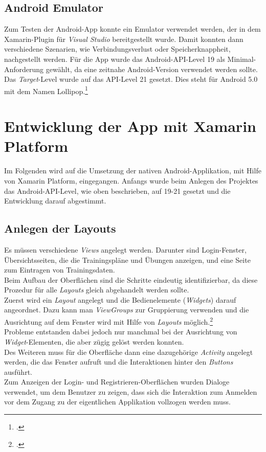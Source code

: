 \subsection{Android Emulator}
\label{ssec:xamarin-emulator}
Zum Testen der Android-App konnte ein Emulator verwendet werden, der in dem Xamarin-Plugin für \textit{Visual Studio} bereitgestellt wurde. Damit konnten dann verschiedene Szenarien, wie Verbindungsverlust oder Speicherknappheit, nachgestellt werden. Für die App wurde das Android-API-Level 19 als Minimal-Anforderung gewählt, da eine zeitnahe Android-Version verwendet werden sollte. Das \textit{Target}-Level wurde auf das API-Level 21 gesetzt. Dies steht für Android 5.0 mit dem Namen Lollipop.\footcite{Xamarin-API}
\section{Entwicklung der App mit Xamarin Platform}
\label{sec:nat-umsetzung}
Im Folgenden wird auf die Umsetzung der nativen Android-Applikation, mit Hilfe von Xamarin Platform, eingegangen. Anfangs wurde beim Anlegen des Projektes das Android-API-Level, wie oben beschrieben, auf 19-21 gesetzt und die Entwicklung darauf abgestimmt.

\subsection{Anlegen der Layouts}
\label{ssec:nat-layouts}
Es müssen verschiedene \textit{Views} angelegt werden. Darunter sind Login-Fenster, Übersichtsseiten, die die Trainingspläne und Übungen anzeigen, und eine Seite zum Eintragen von Trainingsdaten.\\
Beim Aufbau der Oberflächen sind die Schritte eindeutig identifizierbar, da diese Prozedur für alle \textit{Layouts} gleich abgehandelt werden sollte.\\
Zuerst wird ein \textit{Layout} angelegt und die Bedienelemente (\textit{Widgets}) darauf angeordnet. Dazu kann man \textit{ViewGroups} zur Gruppierung verwenden und die Ausrichtung auf dem Fenster wird mit Hilfe von \textit{Layouts} möglich.\footcite[Vgl. S. 58ff.]{Android-BeckerPant}\\
Probleme entstanden dabei jedoch nur manchmal bei der Ausrichtung von \textit{Widget}-Elementen, die aber zügig gelöst werden konnten.\\
Des Weiteren muss für die Oberfläche dann eine dazugehörige \textit{Activity} angelegt werden, die das Fenster aufruft und die Interaktionen hinter den \textit{Buttons} ausführt.\\
Zum Anzeigen der Login- und Registrieren-Oberflächen wurden Dialoge verwendet, um dem Benutzer zu zeigen, dass sich die Interaktion zum Anmelden vor dem Zugang zu der eigentlichen Applikation vollzogen werden muss.\\
